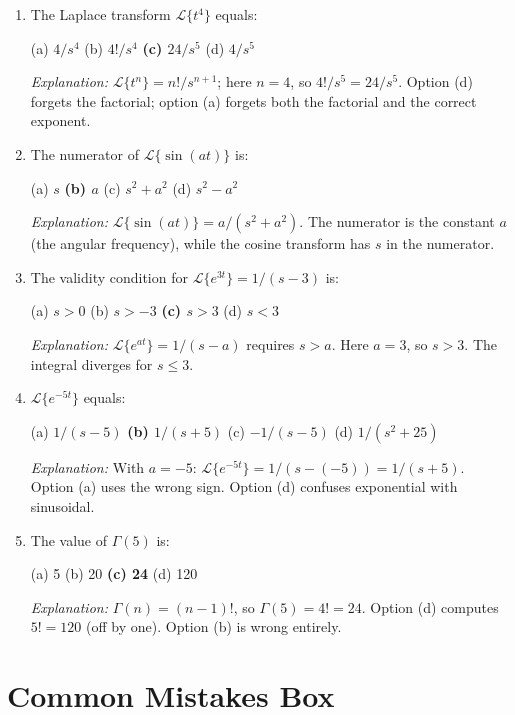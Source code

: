 \documentclass[12pt,a4paper]{article}
\begin{document}
\begin{enumerate}[leftmargin=*, label=\textbf{MCQ \arabic*.}]

\item The Laplace transform $\mathcal{L}\{t^4\}$ equals:

(a) $4/s^4$ \quad (b) $4!/s^4$ \quad \textbf{(c) $24/s^5$} \quad (d) $4/s^5$

\textit{Explanation:} $\mathcal{L}\{t^n\} = n!/s^{n+1}$; here $n=4$, so $4!/s^5 = 24/s^5$.
Option (d) forgets the factorial; option (a) forgets both the factorial and the correct
exponent.

\item The numerator of $\mathcal{L}\{\sin(at)\}$ is:

(a) $s$ \quad \textbf{(b) $a$} \quad (c) $s^2+a^2$ \quad (d) $s^2-a^2$

\textit{Explanation:} $\mathcal{L}\{\sin(at)\} = a/(s^2+a^2)$. The numerator is the
constant $a$ (the angular frequency), while the cosine transform has $s$ in the numerator.

\item The validity condition for $\mathcal{L}\{e^{3t}\} = 1/(s-3)$ is:

(a) $s > 0$ \quad (b) $s > -3$ \quad \textbf{(c) $s > 3$} \quad (d) $s < 3$

\textit{Explanation:} $\mathcal{L}\{e^{at}\} = 1/(s-a)$ requires $s > a$. Here $a = 3$,
so $s > 3$. The integral diverges for $s \leq 3$.

\item $\mathcal{L}\{e^{-5t}\}$ equals:

(a) $1/(s-5)$ \quad \textbf{(b) $1/(s+5)$} \quad (c) $-1/(s-5)$ \quad (d) $1/(s^2+25)$

\textit{Explanation:} With $a = -5$: $\mathcal{L}\{e^{-5t}\} = 1/(s-(-5)) = 1/(s+5)$.
Option (a) uses the wrong sign. Option (d) confuses exponential with sinusoidal.

\item The value of $\Gamma(5)$ is:

(a) 5 \quad (b) 20 \quad \textbf{(c) 24} \quad (d) 120

\textit{Explanation:} $\Gamma(n) = (n-1)!$, so $\Gamma(5) = 4! = 24$.
Option (d) computes $5! = 120$ (off by one). Option (b) is wrong entirely.

\end{enumerate}

\section{Common Mistakes Box}
\end{document}
